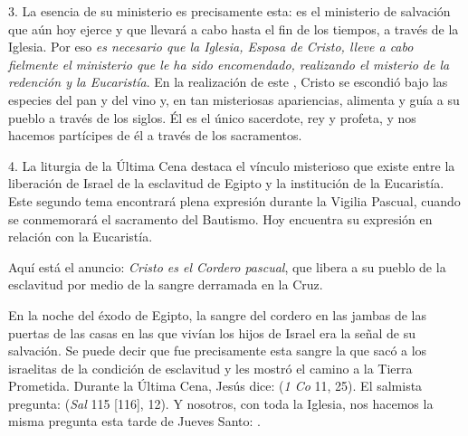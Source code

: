 \begin{body}
3. La esencia de su ministerio es precisamente esta: es el ministerio de salvación que aún hoy ejerce y que llevará a cabo hasta el fin de los tiempos, a través de la Iglesia. Por eso \textit{es necesario que la Iglesia, Esposa de Cristo, lleve a cabo fielmente el ministerio que le ha sido encomendado, realizando el misterio de la redención y la Eucaristía}. En la realización de este , Cristo se escondió bajo las especies del pan y del vino y, en tan misteriosas apariencias, alimenta y guía a su pueblo a través de los siglos. Él es el único sacerdote, rey y profeta, y nos hacemos partícipes de él a través de los sacramentos. 

4. La liturgia de la Última Cena destaca el vínculo misterioso que existe entre la liberación de Israel de la esclavitud de Egipto y la institución de la Eucaristía. Este segundo tema encontrará plena expresión durante la Vigilia Pascual, cuando se conmemorará el sacramento del Bautismo. Hoy encuentra su expresión en relación con la Eucaristía. 

Aquí está el anuncio: \textit{Cristo es el Cordero pascual}, que libera a su pueblo de la esclavitud por medio de la sangre derramada en la Cruz. 

En la noche del éxodo de Egipto, la sangre del cordero en las jambas de las puertas de las casas en las que vivían los hijos de Israel era la señal de su salvación. Se puede decir que fue precisamente esta sangre la que sacó a los israelitas de la condición de esclavitud y les mostró el camino a la Tierra Prometida. Durante la Última Cena, Jesús dice:  (\textit{1 Co} 11, 25). El salmista pregunta:  (\textit{Sal} 115 [116], 12). Y nosotros, con toda la Iglesia, nos hacemos la misma pregunta esta tarde de Jueves Santo: .
\end{body}


